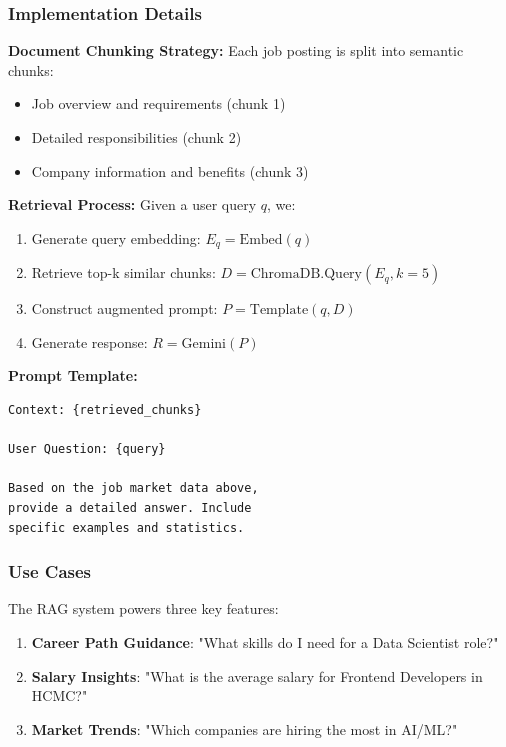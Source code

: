 \subsubsection{Implementation Details}

\textbf{Document Chunking Strategy:}
Each job posting is split into semantic chunks:
\begin{itemize}
\item Job overview and requirements (chunk 1)
\item Detailed responsibilities (chunk 2)
\item Company information and benefits (chunk 3)
\end{itemize}

\textbf{Retrieval Process:}
Given a user query $q$, we:
\begin{enumerate}
\item Generate query embedding: $E_q = \text{Embed}(q)$
\item Retrieve top-k similar chunks: $D = \text{ChromaDB.Query}(E_q, k=5)$
\item Construct augmented prompt: $P = \text{Template}(q, D)$
\item Generate response: $R = \text{Gemini}(P)$
\end{enumerate}

\textbf{Prompt Template:}
\begin{verbatim}
Context: {retrieved_chunks}

User Question: {query}

Based on the job market data above, 
provide a detailed answer. Include 
specific examples and statistics.
\end{verbatim}

\subsubsection{Use Cases}

The RAG system powers three key features:

\begin{enumerate}
\item \textbf{Career Path Guidance}: "What skills do I need for a Data Scientist role?"
\item \textbf{Salary Insights}: "What is the average salary for Frontend Developers in HCMC?"
\item \textbf{Market Trends}: "Which companies are hiring the most in AI/ML?"
\end{enumerate}

